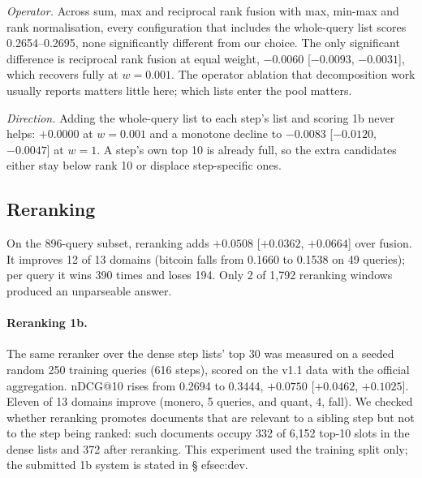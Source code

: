 \documentclass[11pt]{article}
\begin{document}
\emph{Operator.} Across sum, max and reciprocal rank fusion \citep{cormack2009rrf} with max,
min-max and rank normalisation, every configuration that includes the whole-query list scores
0.2654--0.2695, none significantly different from our choice. The only significant difference
is reciprocal rank fusion at equal weight, $-0.0060$ [$-0.0093$, $-0.0031$], which recovers fully
at $w{=}0.001$. The operator ablation that decomposition work usually reports
\citep{zhong2025redi} matters little here; which lists enter the pool matters.

\emph{Direction.} Adding the whole-query list to each step's list and scoring 1b never helps:
$+0.0000$ at $w{=}0.001$ and a monotone decline to $-0.0083$ [$-0.0120$, $-0.0047$] at $w{=}1$.
A step's own top 10 is already full, so the extra candidates either stay below rank 10 or
displace step-specific ones.

\subsection{Reranking}
\label{sec:rerank}
On the 896-query subset, reranking adds $+0.0508$ [$+0.0362$, $+0.0664$] over fusion. It improves
12 of 13 domains (bitcoin falls from 0.1660 to 0.1538 on 49 queries); per query it wins 390
times and loses 194. Only 2 of 1,792 reranking windows produced an unparseable answer.

\paragraph{Reranking 1b.} The same reranker over the dense step lists' top 30 was measured on a
seeded random 250 training queries (616 steps), scored on the v1.1 data with the official
aggregation. %
nDCG@10 rises from 0.2694 to 0.3444, $+0.0750$ [$+0.0462$, $+0.1025$]. Eleven of 13 domains
improve (monero, 5 queries, and quant, 4, fall). We checked whether reranking promotes documents
that are relevant to a sibling step but not to the step being ranked: such documents occupy 332 of
6,152 top-10 slots in the dense lists and 372 after reranking. This experiment used the training
split only; the submitted 1b system is stated in \S
ef{sec:dev}.
\end{document}
